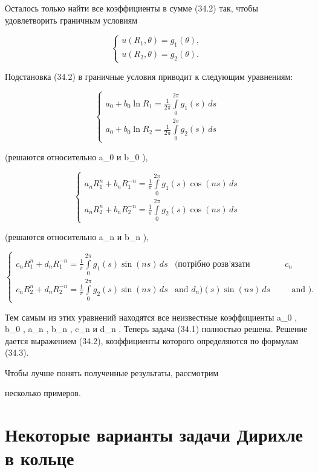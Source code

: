 \documentclass[
  ukrainian,
]{article}
\begin{document}
Осталось только найти все коэффициенты в сумме (34.2) так, чтобы
удовлетворить граничным условиям

\[
\begin{cases} u(R_1, \theta) = g_1(\theta), \\ u(R_2, \theta) = g_2(\theta). \end{cases}
\]

Подстановка (34.2) в граничные условия приводит к следующим уравнениям:

\[
\begin{cases} a_0 + b_0 \ln R_1 = \frac{1}{2\pi} \int\limits_0^{2\pi} g_1(s) \, ds \\ a_0 + b_0 \ln R_2 = \frac{1}{2\pi} \int\limits_0^{2\pi} g_2(s) \, ds \end{cases}
\]

(решаются относительно a\_0 и b\_0 ),

\[
\begin{cases} a_n R_1^n + b_n R_1^{-n} = \frac{1}{\pi} \int\limits_0^{2\pi} g_1(s) \cos(ns) \, ds \\ a_n R_2^n + b_n R_2^{-n} = \frac{1}{\pi} \int\limits_0^{2\pi} g_2(s) \cos(ns) \, ds \end{cases}
\]

(решаются относительно a\_n и b\_n ),

\[
\begin{cases} c_n R_1^n + d_n R_1^{-n} = \frac{1}{\pi} \int\limits_0^{2\pi} g_1(s) \sin{(ns)} \, ds & \text{(потрібно розв'язати відносно } c_n \\ c_n R_2^n + d_n R_2^{-n} = \frac{1}{\pi} \int\limits_0^{2\pi} g_2(s) \sin{(ns)} \, ds & \text{and } d_n \text{)} (s) \sin{(ns)} \, ds & \text{and }  \text{)}. \end{cases}
\]

Тем самым из этих уравнений находятся все неизвестные коэффициенты a\_0
, b\_0 , a\_n , b\_n , c\_n и d\_n . Теперь задача (34.1) полностью
решена. Решение дается выражением (34.2), коэффициенты которого
определяются по формулам (34.3).

Чтобы лучше понять полученные результаты, рассмотрим

несколько примеров.

\section{Некоторые варианты задачи Дирихле в
кольце}\label{ux43dux435ux43aux43eux442ux43eux440ux44bux435-ux432ux430ux440ux438ux430ux43dux442ux44b-ux437ux430ux434ux430ux447ux438-ux434ux438ux440ux438ux445ux43bux435-ux432-ux43aux43eux43bux44cux446ux435}
\end{document}
